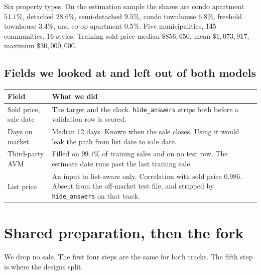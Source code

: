 \documentclass[11pt]{article}
\newcommand{\la}{list-aware}
\begin{document}
Six property types. On the estimation sample the shares are condo apartment \(51.1\%\), detached \(28.6\%\), semi-detached \(9.5\%\), condo townhouse \(6.8\%\), freehold townhouse \(3.4\%\), and co-op apartment \(0.5\%\). Five municipalities, 145 communities, 16 styles. Training sold-price median \(\$856{,}650\), mean \(\$1{,}073{,}917\), maximum \(\$30{,}000{,}000\).

\subsection{Fields we looked at and left out of both models}

\begin{center}
\small
\begin{tabular}{p{3.4cm}p{11.0cm}}
\toprule
Field & What we did \\
\midrule
Sold price, sale date & The target and the clock. \texttt{hide\_answers} strips both before a validation row is scored. \\
Days on market & Median 12 days. Known when the sale closes. Using it would leak the path from list date to sale date. \\
Third-party AVM & Filled on \(99.1\%\) of training sales and on no test row. The estimate date runs past the last training sale. \\
List price & An input to \la{} only. Correlation with sold price \(0.986\). Absent from the off-market test file, and stripped by \texttt{hide\_answers} on that track. \\
\bottomrule
\end{tabular}
\end{center}

\section{Shared preparation, then the fork}
\label{sec:clean}

We drop no sale. The first four steps are the same for both tracks. The fifth step is where the designs split.
\end{document}
